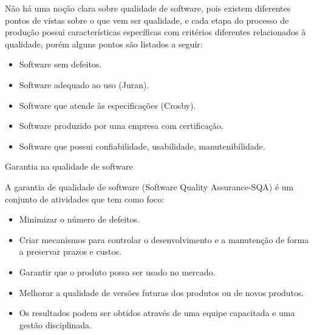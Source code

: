 \frame{\title{\insertlecture}\maketitle}

\begin{frame}{\insertlecture}
Não há uma noção clara sobre qualidade de software, pois existem
diferentes pontos de vistas sobre o que vem ser qualidade, e cada
etapa do processo de produção possui características específicas com
critérios diferentes relacionados à qualidade, porém alguns pontos
são listados a seguir:
\pause
\begin{itemize}[<+->]
\item Software sem defeitos.
\item Software adequado ao uso (Juran).
\item Software que atende às especificações (Crosby).
\item Software produzido por uma empresa com certificação.
\item Software que possui confiabilidade, usabilidade, manutenibilidade.
\end{itemize}

\end{frame}

\begin{frame}{Garantia na qualidade de software}

A garantia de qualidade de software (Software Quality Assurance-SQA) é um conjunto de atividades que tem como foco:
\pause
\begin{itemize}[<+->]
\item Minimizar o número de defeitos.
\item Criar mecanismos para controlar o desenvolvimento e a manutenção de forma a preservar prazos e custos.
\item Garantir que o produto possa ser usado no mercado.
\item Melhorar a qualidade de versões futuras dos produtos ou de novos produtos.
\item Os resultados podem ser obtidos através de uma equipe capacitada e uma gestão disciplinada.
\end{itemize}

\end{frame}

